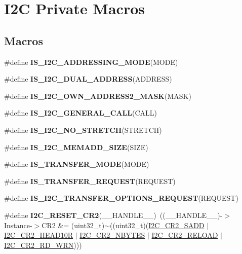\hypertarget{group___i2_c___private___macro}{}\section{I2C Private Macros}
\label{group___i2_c___private___macro}
\subsection*{Macros}
\begin{DoxyCompactItemize}
\item 
\#define {\bfseries I\+S\+\_\+\+I2\+C\+\_\+\+A\+D\+D\+R\+E\+S\+S\+I\+N\+G\+\_\+\+M\+O\+DE}(M\+O\+DE)
\item 
\#define {\bfseries I\+S\+\_\+\+I2\+C\+\_\+\+D\+U\+A\+L\+\_\+\+A\+D\+D\+R\+E\+SS}(A\+D\+D\+R\+E\+SS)
\item 
\#define {\bfseries I\+S\+\_\+\+I2\+C\+\_\+\+O\+W\+N\+\_\+\+A\+D\+D\+R\+E\+S\+S2\+\_\+\+M\+A\+SK}(M\+A\+SK)
\item 
\#define {\bfseries I\+S\+\_\+\+I2\+C\+\_\+\+G\+E\+N\+E\+R\+A\+L\+\_\+\+C\+A\+LL}(C\+A\+LL)
\item 
\#define {\bfseries I\+S\+\_\+\+I2\+C\+\_\+\+N\+O\+\_\+\+S\+T\+R\+E\+T\+CH}(S\+T\+R\+E\+T\+CH)
\item 
\#define {\bfseries I\+S\+\_\+\+I2\+C\+\_\+\+M\+E\+M\+A\+D\+D\+\_\+\+S\+I\+ZE}(S\+I\+ZE)
\item 
\#define {\bfseries I\+S\+\_\+\+T\+R\+A\+N\+S\+F\+E\+R\+\_\+\+M\+O\+DE}(M\+O\+DE)
\item 
\#define {\bfseries I\+S\+\_\+\+T\+R\+A\+N\+S\+F\+E\+R\+\_\+\+R\+E\+Q\+U\+E\+ST}(R\+E\+Q\+U\+E\+ST)
\item 
\#define {\bfseries I\+S\+\_\+\+I2\+C\+\_\+\+T\+R\+A\+N\+S\+F\+E\+R\+\_\+\+O\+P\+T\+I\+O\+N\+S\+\_\+\+R\+E\+Q\+U\+E\+ST}(R\+E\+Q\+U\+E\+ST)
\item 
\mbox{\label{group___i2_c___private___macro_ga84085a3fd5b43f29ec449d86560a9378}} 
\#define {\bfseries I2\+C\+\_\+\+R\+E\+S\+E\+T\+\_\+\+C\+R2}(\+\_\+\+\_\+\+H\+A\+N\+D\+L\+E\+\_\+\+\_\+)~((\+\_\+\+\_\+\+H\+A\+N\+D\+L\+E\+\_\+\+\_\+)-\/$>$Instance-\/$>$C\+R2 \&= (uint32\+\_\+t)$\sim$((uint32\+\_\+t)(\hyperlink{group___peripheral___registers___bits___definition_ga1a0478d3d85fc6aba608390ee2ea2d1c}{I2\+C\+\_\+\+C\+R2\+\_\+\+S\+A\+DD} $\vert$ \hyperlink{group___peripheral___registers___bits___definition_ga2de0f12e6fb297c2c29bee5504e54377}{I2\+C\+\_\+\+C\+R2\+\_\+\+H\+E\+A\+D10R} $\vert$ \hyperlink{group___peripheral___registers___bits___definition_ga23a58895a897ccc34a8cbbe36b412b69}{I2\+C\+\_\+\+C\+R2\+\_\+\+N\+B\+Y\+T\+ES} $\vert$ \hyperlink{group___peripheral___registers___bits___definition_ga21a796045451013c964ef8b12ca6c9bb}{I2\+C\+\_\+\+C\+R2\+\_\+\+R\+E\+L\+O\+AD} $\vert$ \hyperlink{group___peripheral___registers___bits___definition_ga268ec714bbe4a75ea098c0e230a87697}{I2\+C\+\_\+\+C\+R2\+\_\+\+R\+D\+\_\+\+W\+RN})))

\end{DoxyCompactItemize}
